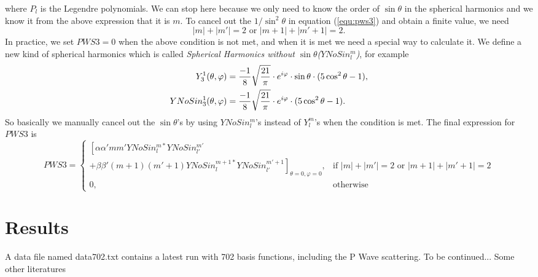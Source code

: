 \documentclass[british,english]{article}
\numberwithin{equation}{section}
\numberwithin{figure}{section}
\begin{document}
where $P_l$ is the Legendre polynomials. We can stop here because we only need to know the order of $\sin \theta$ in the spherical harmonics and we know it from the above expression that it is $m$. To cancel out the $1/\sin ^2 \theta$ in equation (\ref{equ:pws3}) and obtain a finite value, we need
\begin{equation} 
|m|+|m'|=2 \text{ or } |m+1|+|m'+1|=2.
\end{equation}
 In practice, we set $PWS3=0$ when the above condition is not met, and when it is met we need a special way to calculate it. We define a new kind of spherical harmonics which is called \emph{Spherical Harmonics without $\sin \theta$($YNoSin_l^m$)}, for example
\begin{equation}
\begin{aligned}
Y_{3}^{1}(\theta ,\varphi )&={-1 \over 8}{\sqrt {21 \over \pi }}\cdot e^{i\varphi }\cdot \sin \theta \cdot (5\cos ^{2}\theta -1),\\
YNoSin_{3}^{1}(\theta ,\varphi )&={-1 \over 8}{\sqrt {21 \over \pi }}\cdot e^{i\varphi }\cdot (5\cos ^{2}\theta -1).
\end{aligned}
\end{equation}
So basically we manually cancel out the $\sin \theta$'s by using $YNoSin_l^m$'s instead of $Y_l^m$'s when the condition is met. The final expression for $PWS3$ is
\begin{equation}
PWS3=
\begin{cases}
   \left[\alpha\alpha'mm'YNoSin_l^{m*} YNoSin_{l'}^{m'}\right.\\
   +\left.\beta\beta'(m+1)(m'+1)YNoSin_{l}^{m+1*}YNoSin_{l'}^{m'+1}\right]_{\theta=0,\varphi=0} ,& \text{if } |m|+|m'|=2 \text{ or } |m+1|+|m'+1|=2\\
    0,              & \text{otherwise}
\end{cases}
\end{equation}
\section{Results}
A data file named data702.txt contains a latest run with 702 basis functions, including the P Wave scattering. To be continued... 
Some other literatures\cite{Anderson2014,Biedenharn1981,Balewski2014,Bendkowsky2009,Kurz2013,Bendkowsky2010}


\end{document}
